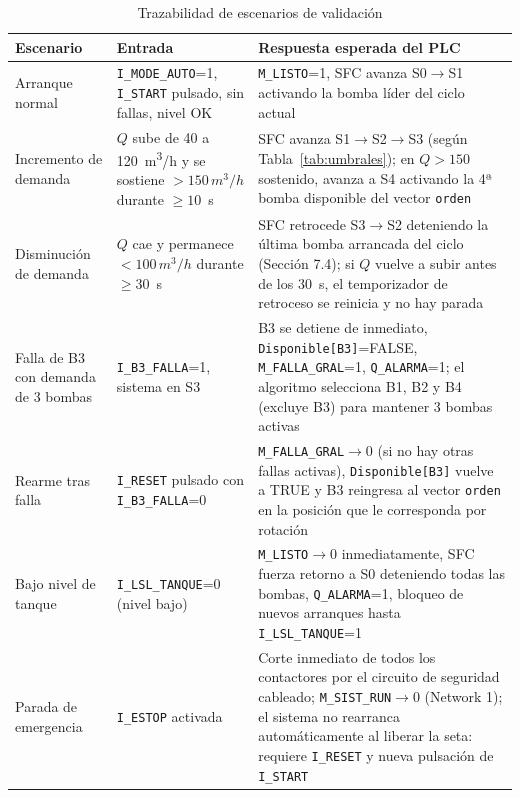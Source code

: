 \documentclass[conference]{IEEEtran}
\begin{document}
\begin{table}[t]
\centering
\caption{Trazabilidad de escenarios de validación}
\label{tab:validacion}
\renewcommand{\arraystretch}{1.3}
\begin{tabular}{|p{2.6cm}|p{6.5cm}|p{7.8cm}|}
\hline
\textbf{Escenario} & \textbf{Entrada} & \textbf{Respuesta esperada del PLC} \\
\hline
Arranque normal & \texttt{I\_MODE\_AUTO}=1, \texttt{I\_START} pulsado, sin fallas, nivel OK & \texttt{M\_LISTO}=1, SFC avanza S0$\to$S1 activando la bomba líder del ciclo actual \\ \hline
Incremento de demanda & $Q$ sube de 40 a 120~\si{m^3/h} y se sostiene ${>}150\,\si{m^3/h}$ durante $\geq10$~s & SFC avanza S1$\to$S2$\to$S3 (según Tabla~\ref{tab:umbrales}); en $Q{>}150$ sostenido, avanza a S4 activando la 4ª bomba disponible del vector \texttt{orden} \\ \hline
Disminución de demanda & $Q$ cae y permanece ${<}100\,\si{m^3/h}$ durante $\geq30$~s & SFC retrocede S3$\to$S2 deteniendo la última bomba arrancada del ciclo (Sección 7.4); si $Q$ vuelve a subir antes de los 30~s, el temporizador de retroceso se reinicia y no hay parada \\ \hline
Falla de B3 con demanda de 3 bombas & \texttt{I\_B3\_FALLA}=1, sistema en S3 & B3 se detiene de inmediato, \texttt{Disponible[B3]}=FALSE, \texttt{M\_FALLA\_GRAL}=1, \texttt{Q\_ALARMA}=1; el algoritmo selecciona B1, B2 y B4 (excluye B3) para mantener 3 bombas activas \\ \hline
Rearme tras falla & \texttt{I\_RESET} pulsado con \texttt{I\_B3\_FALLA}=0 & \texttt{M\_FALLA\_GRAL}$\to$0 (si no hay otras fallas activas), \texttt{Disponible[B3]} vuelve a TRUE y B3 reingresa al vector \texttt{orden} en la posición que le corresponda por rotación \\ \hline
Bajo nivel de tanque & \texttt{I\_LSL\_TANQUE}=0 (nivel bajo) & \texttt{M\_LISTO}$\to$0 inmediatamente, SFC fuerza retorno a S0 deteniendo todas las bombas, \texttt{Q\_ALARMA}=1, bloqueo de nuevos arranques hasta \texttt{I\_LSL\_TANQUE}=1 \\ \hline
Parada de emergencia & \texttt{I\_ESTOP} activada & Corte inmediato de todos los contactores por el circuito de seguridad cableado; \texttt{M\_SIST\_RUN}$\to$0 (Network 1); el sistema no rearranca automáticamente al liberar la seta: requiere \texttt{I\_RESET} y nueva pulsación de \texttt{I\_START} \\ \hline
\end{tabular}
\end{table}
\end{document}
